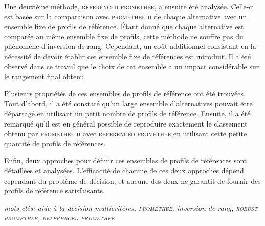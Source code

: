 \newpage 
Une deuxième méthode, \textsc{referenced promethee}, a ensuite été analysée.
Celle-ci est basée sur la comparaison avec \textsc{promethee ii} de chaque alternative avec un ensemble fixe de profils de référence.
Étant donné que chaque alternative est comparée au même ensemble fixe de profils, cette méthode ne souffre pas du phénomène d'inversion de rang.
Cependant, un coût additionnel consistant en la nécessité de devoir établir cet ensemble fixe de références est introduit.
Il a été observé dans ce travail que le choix de cet ensemble a un impact considérable sur le rangement final obtenu.

Plusieurs propriétés de ces ensembles de profils de référence ont été trouvées. Tout d'abord, il a été constaté qu'un large ensemble d'alternatives pouvait être départagé en utilisant un petit nombre de profils de référence.
Ensuite, il a été remarqué qu'il est en général possible de reproduire exactement le classement obtenu par \textsc{promethee ii} avec \textsc{referenced promethee} en utilisant cette petite quantité de profils de références.

Enfin, deux approches pour définir ces ensembles de profils de références sont détaillées et analysées. L'efficacité de chacune de ces deux approches dépend cependant du problème de décision, et aucune des deux ne garantit de fournir des profils de référence satisfaisants.


\textit{mots-clés: aide à la décision multicritères, \textsc{promethee}, inversion de rang, \textsc{robust promethee}, \textsc{referenced promethee}}

